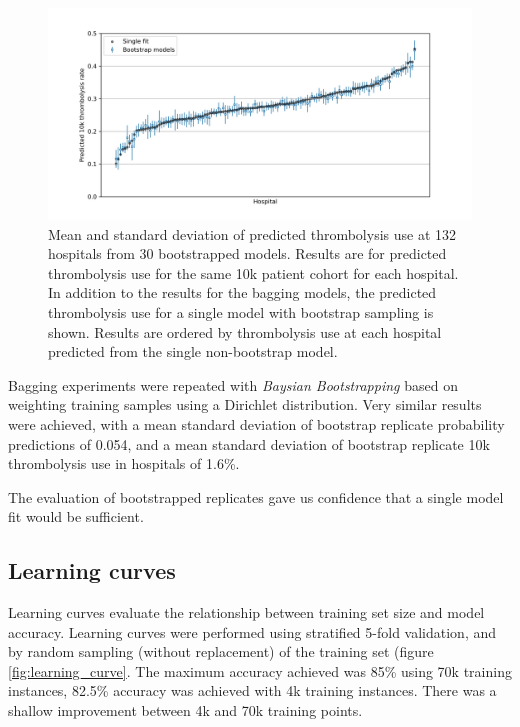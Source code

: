 \begin{figure}
\centering
\includegraphics[width=1\textwidth]{./images/50_bootstrap_10k_sd}
\caption{Mean and standard deviation of predicted thrombolysis use at 132 hospitals from 30 bootstrapped models. Results are for predicted thrombolysis use for the same 10k patient cohort for each hospital. In addition to the results for the bagging models, the predicted thrombolysis use for a single model with bootstrap sampling is shown. Results are ordered by thrombolysis use at each hospital predicted from the single non-bootstrap model.}
\label{fig:bootstrap_2}
\end{figure}

Bagging experiments were repeated with \emph{Baysian Bootstrapping} based on weighting training samples using a Dirichlet distribution. Very similar results were achieved, with a mean standard deviation of bootstrap replicate probability predictions of 0.054, and a mean standard deviation of bootstrap replicate 10k thrombolysis use in hospitals of 1.6\%.

The evaluation of bootstrapped replicates gave us confidence that a single model fit would be sufficient. 



\subsection{Learning curves}

Learning curves evaluate the relationship between training set size and model accuracy. Learning curves were performed using stratified 5-fold validation, and by random sampling (without replacement) of the training set (figure \ref{fig:learning_curve}. The maximum accuracy achieved was 85\% using 70k training instances, 82.5\% accuracy was achieved with 4k training instances. There was a shallow improvement between 4k and 70k training points.

